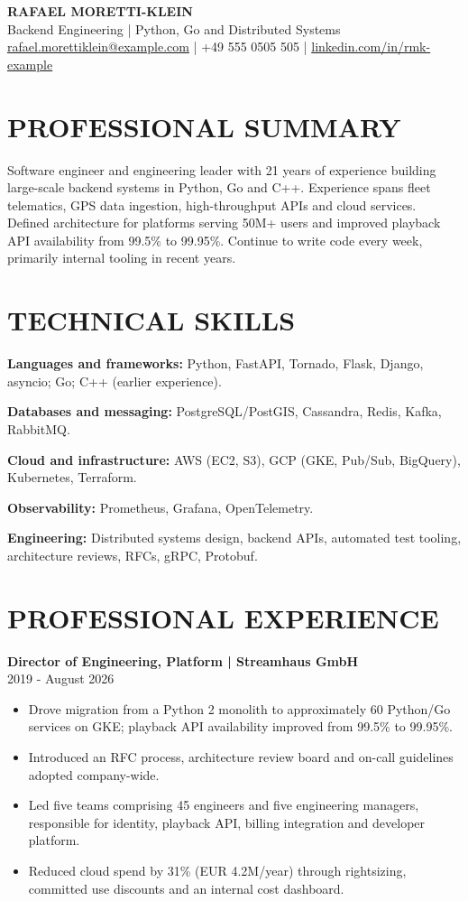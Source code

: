 \documentclass[11pt,a4paper]{article}
\newcommand{\cvsection}[1]{\section*{#1}}
\newcommand{\cvrole}[2]{\Needspace{7\baselineskip}\noindent\textbf{#1}\\#2\par}
\begin{document}
\begin{center}
{\LARGE\bfseries\color{primarycolor} RAFAEL MORETTI-KLEIN}\\[0.4em]
{\large\color{accentcolor} Backend Engineering | Python, Go and Distributed Systems}\\[0.4em]
{\small \href{mailto:rafael.morettiklein@example.com}{rafael.morettiklein@example.com} | +49 555 0505 505 | \href{https://linkedin.com/in/rmk-example}{linkedin.com/in/rmk-example}}
\end{center}
\cvsection{PROFESSIONAL SUMMARY}
Software engineer and engineering leader with 21 years of experience building large-scale backend systems in Python, Go and C++. Experience spans fleet telematics, GPS data ingestion, high-throughput APIs and cloud services. Defined architecture for platforms serving 50M+ users and improved playback API availability from 99.5\% to 99.95\%. Continue to write code every week, primarily internal tooling in recent years.
\cvsection{TECHNICAL SKILLS}
\textbf{Languages and frameworks:} Python, FastAPI, Tornado, Flask, Django, asyncio; Go; C++ (earlier experience).\par
\textbf{Databases and messaging:} PostgreSQL/PostGIS, Cassandra, Redis, Kafka, RabbitMQ.\par
\textbf{Cloud and infrastructure:} AWS (EC2, S3), GCP (GKE, Pub/Sub, BigQuery), Kubernetes, Terraform.\par
\textbf{Observability:} Prometheus, Grafana, OpenTelemetry.\par
\textbf{Engineering:} Distributed systems design, backend APIs, automated test tooling, architecture reviews, RFCs, gRPC, Protobuf.
\cvsection{PROFESSIONAL EXPERIENCE}
\cvrole{Director of Engineering, Platform | Streamhaus GmbH}{2019 - August 2026}
\begin{itemize}
\item Drove migration from a Python 2 monolith to approximately 60 Python/Go services on GKE; playback API availability improved from 99.5\% to 99.95\%.
\item Introduced an RFC process, architecture review board and on-call guidelines adopted company-wide.
\item Led five teams comprising 45 engineers and five engineering managers, responsible for identity, playback API, billing integration and developer platform.
\item Reduced cloud spend by 31\% (EUR 4.2M/year) through rightsizing, committed use discounts and an internal cost dashboard.
\end{itemize}
\end{document}

